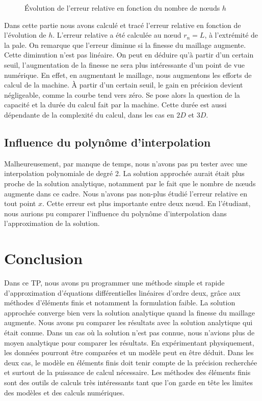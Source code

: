 \documentclass[a4paper,10pt]{report} %
\begin{document}
\begin{figure}[H]
\begin{center}
\end{center}
\caption{Évolution de l'erreur relative en fonction du nombre de nœuds $h$}
\label{Erreur relative fct de N}
\end{figure}

Dans cette partie nous avons calculé et tracé l'erreur relative en fonction de l'évolution de $h$. L'erreur relative a été calculée au nœud $r_{n}=L$, à l'extrémité de la pale.
On remarque que l'erreur diminue si la finesse du maillage augmente. Cette diminution n'est pas linéaire. On peut en déduire qu'à partir d'un certain seuil, l'augmentation de la finesse ne sera plus intéressante d'un point de vue numérique. En effet, en augmentant le maillage, nous augmentons les efforts de calcul de la machine. À partir d'un certain seuil, le gain en précision devient négligeable, comme la courbe tend vers zéro.
Se pose alors la question de la capacité et la durée du calcul fait par la machine. Cette durée est aussi dépendante de la complexité du calcul, dans les cas en $2D$ et $3D$. 




\subsection{Influence du polynôme d'interpolation}

Malheureusement, par manque de temps, nous n'avons pas pu tester avec une interpolation polynomiale de degré 2. La solution approchée aurait était plus proche de la solution analytique, notamment par le fait que le nombre de nœuds augmente dans ce cadre.
Nous n'avons pas non-plus étudié l'erreur relative en tout point $x$. Cette erreur est plus importante entre deux nœud. En l'étudiant, nous aurions pu comparer l'influence du polynôme d'interpolation dans l'approximation de la solution.

\section{Conclusion}

Dans ce TP, nous avons pu programmer une méthode simple et rapide d'approximation d'équations différentielles linéaires d'ordre deux, grâce aux méthodes d'éléments finis et notamment la formulation faible. La solution approchée converge bien vers la solution analytique quand la finesse du maillage augmente.
Nous avons pu comparer les résultats avec la solution analytique qui était connue. 
Dans un cas où la solution n'est pas connue, nous n'avions plus de moyen analytique pour comparer les résultats. En expérimentant physiquement, les données pourront être comparées et un modèle peut en être déduit.
Dans les deux cas, le modèle en éléments finis doit tenir compte de la précision recherchée et surtout de la puissance de calcul nécessaire.
Les méthodes des éléments finis sont des outils de calculs très intéressants tant que l'on garde en tête les limites des modèles et des calculs numériques.
\end{document}
